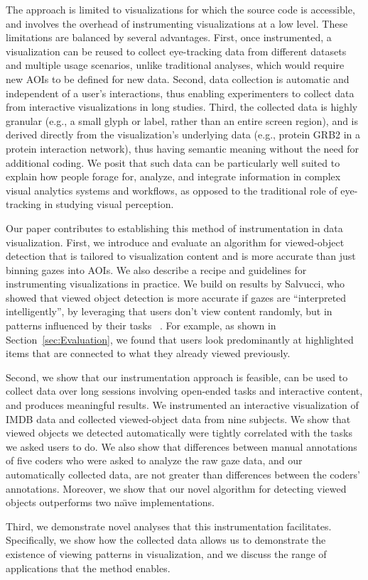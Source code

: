 The approach is limited to visualizations for which the source code is accessible, and involves the overhead of instrumenting visualizations at a low level. These limitations are balanced by several advantages.  First, once instrumented, a visualization can be reused to collect eye-tracking data from different  datasets and multiple usage scenarios, unlike traditional analyses, which would require new AOIs to be defined for new data. Second, data collection is automatic and independent of a user's interactions, thus enabling experimenters to collect data from interactive visualizations in long studies.  Third, the collected data is highly granular (e.g., a small glyph or label, rather than an entire screen region), and is derived directly from the visualization's underlying data (e.g., protein GRB2 in a protein interaction network), thus having semantic meaning without the need for additional coding. We posit that such data can be particularly well suited to explain how people forage for, analyze, and integrate information in complex visual analytics systems and workflows, as opposed to the traditional role of eye-tracking in studying visual perception. 


Our paper contributes to establishing this method of instrumentation in data visualization. First, we introduce and evaluate an algorithm for viewed-object detection that is tailored to visualization content and is more accurate than just binning gazes into AOIs. We also describe a recipe and guidelines for instrumenting visualizations in practice. We build on results by Salvucci, who showed that viewed object detection is more accurate if gazes are ``interpreted intelligently'', by leveraging that users don't view content randomly, but in patterns influenced by their tasks ~\cite{salvucci1999inferring, salvucci2000intelligent}. For example, as shown in Section~\ref{sec:Evaluation}, we found that users look predominantly at highlighted items that are connected to what they already viewed previously. 

Second, we show that our instrumentation approach is feasible, can be used to collect data over long sessions involving open-ended tasks and interactive content, and produces meaningful results. We instrumented an interactive visualization of IMDB data and collected viewed-object data from nine subjects. We show that viewed objects we detected automatically were tightly correlated with the tasks we asked users to do. We also show that differences between manual annotations of five coders who were asked to analyze the raw gaze data, and our automatically collected data, are not greater than differences between the coders' annotations. Moreover, we show that our novel algorithm for detecting viewed objects outperforms two na\"{\i}ve implementations. 

Third, we demonstrate novel analyses that this instrumentation facilitates. Specifically, we show how the collected data allows us to demonstrate the existence of viewing patterns in visualization, and we discuss the range of applications that the method enables.
